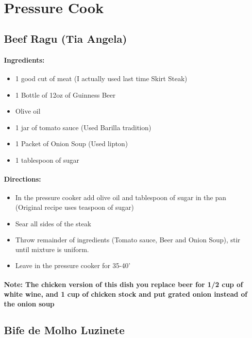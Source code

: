 \documentclass{article}
\begin{document}
\section{Pressure Cook}

\subsection{Beef Ragu (Tia Angela)}

\paragraph{Ingredients:}

\begin{itemize}
	\item 1 good cut of meat (I actually used last time Skirt Steak)
	\item 1 Bottle of 12oz of Guinness Beer
	\item Olive oil
	\item 1 jar of tomato sauce (Used Barilla tradition)
	\item 1 Packet of Onion Soup (Used lipton)
	\item 1 tablespoon of sugar
\end{itemize}

\paragraph{Directions:}
\begin{itemize}
	\item In the pressure cooker add olive oil and tablespoon of sugar in the pan (Original recipe uses teaspoon of sugar)
	\item Sear all sides of the steak
	\item Throw remainder of ingredients (Tomato sauce, Beer and Onion Soup), stir until mixture is uniform.
	\item Leave in the pressure cooker for 35-40'
\end{itemize}

\paragraph{Note: The chicken version of this dish you replace beer for 1/2 cup of white wine, and 1 cup of chicken stock and put grated onion instead of the onion soup}


\subsection{Bife de Molho Luzinete}
\end{document}
